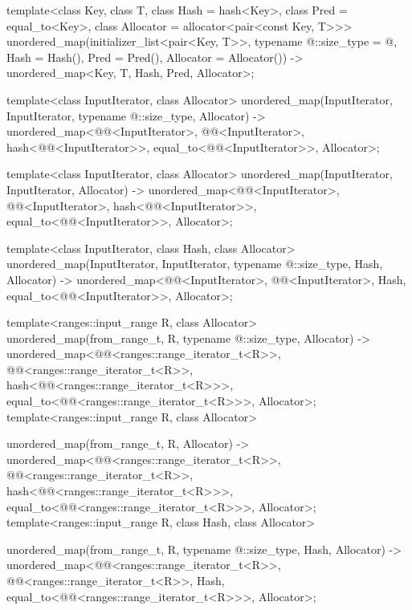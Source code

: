 \documentclass{wg21}
\begin{document}
\begin{codeblock}

template<class Key, class T, class Hash = hash<Key>,
class Pred = equal_to<Key>, class Allocator = allocator<pair<const Key, T>>>
unordered_map(initializer_list<pair<Key, T>>,
typename @\seebelow@::size_type = @\seebelow@, Hash = Hash(),
Pred = Pred(), Allocator = Allocator())
-> unordered_map<Key, T, Hash, Pred, Allocator>;

template<class InputIterator, class Allocator>
unordered_map(InputIterator, InputIterator, typename @\seebelow@::size_type, Allocator)
-> unordered_map<@@<InputIterator>, @@<InputIterator>,
hash<@@<InputIterator>>,
equal_to<@@<InputIterator>>, Allocator>;

template<class InputIterator, class Allocator>
unordered_map(InputIterator, InputIterator, Allocator)
-> unordered_map<@@<InputIterator>, @@<InputIterator>,
hash<@@<InputIterator>>,
equal_to<@@<InputIterator>>, Allocator>;

template<class InputIterator, class Hash, class Allocator>
unordered_map(InputIterator, InputIterator, typename @\seebelow@::size_type, Hash, Allocator)
-> unordered_map<@@<InputIterator>, @@<InputIterator>, Hash,
equal_to<@@<InputIterator>>, Allocator>;


\end{codeblock}
\begin{addedblock}
\begin{codeblock}
template<ranges::input_range R, class Allocator>
unordered_map(from_range_t, R, typename @\seebelow@::size_type, Allocator)
-> unordered_map<@@<ranges::range_iterator_t<R>>, 
        @@<ranges::range_iterator_t<R>>, 
        hash<@@<ranges::range_iterator_t<R>>>,
        equal_to<@@<ranges::range_iterator_t<R>>>, Allocator>;
template<ranges::input_range R, class Allocator>

unordered_map(from_range_t, R, Allocator)
-> unordered_map<@@<ranges::range_iterator_t<R>>, 
    @@<ranges::range_iterator_t<R>>, 
    hash<@@<ranges::range_iterator_t<R>>>,
    equal_to<@@<ranges::range_iterator_t<R>>>, Allocator>;
template<ranges::input_range R, class Hash, class Allocator>

unordered_map(from_range_t, R, typename @\seebelow@::size_type, Hash, Allocator)
-> unordered_map<@@<ranges::range_iterator_t<R>>, 
    @@<ranges::range_iterator_t<R>>, 
    Hash,
    equal_to<@@<ranges::range_iterator_t<R>>>, Allocator>;
\end{codeblock}
\end{addedblock}
\end{document}
